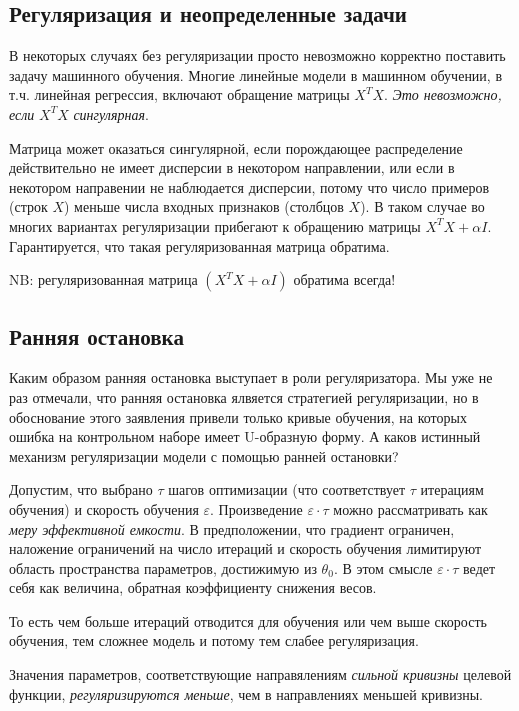 \documentclass[%
	11pt,
	a4paper,
	utf8,
]{article}
\begin{document}
\subsection{Регуляризация и неопределенные задачи}

В некоторых случаях без регуляризации просто невозможно корректно поставить задачу машинного обучения. Многие линейные модели в машинном обучении, в т.ч. линейная регрессия, включают обращение матрицы $ X^TX $. \emph{Это невозможно, если} $ X^T X $ \emph{сингулярная}.

Матрица может оказаться сингулярной, если порождающее распределение действительно не имеет дисперсии в некотором направлении, или если в некотором направении не наблюдается дисперсии, потому что число примеров (строк $ X $) меньше числа входных признаков (столбцов $ X $). В таком случае во многих вариантах регуляризации прибегают к обращению матрицы $ X^T X + \alpha I $. Гарантируется, что такая регуляризованная матрица обратима.

NB: {\color{blue}регуляризованная матрица $ (X^T X + \alpha I) $ обратима всегда!}

\subsection{Ранняя остановка}

Каким образом ранняя остановка выступает в роли регуляризатора. Мы уже не раз отмечали, что ранняя остановка ялвяется стратегией регуляризации, но в обоснование этого заявления привели только кривые обучения, на которых ошибка на контрольном наборе имеет U-образную форму. А каков истинный механизм регуляризации модели с помощью ранней остановки?

Допустим, что выбрано $ \tau $ шагов оптимизации (что соответствует $ \tau $ итерациям обучения) и скорость обучения $ \varepsilon $. Произведение $ \varepsilon \cdot \tau $ можно рассматривать как \emph{меру эффективной емкости}. В предположении, что градиент ограничен, наложение ограничений на число итераций и скорость обучения лимитируют область пространства параметров, достижимую из $ \theta_0 $. В этом смысле $ \varepsilon \cdot \tau $ ведет себя как величина, обратная коэффициенту снижения весов.

То есть чем больше итераций отводится для обучения или чем выше скорость обучения, тем сложнее модель и потому тем слабее регуляризация.

Значения параметров, соответствующие направялениям \emph{сильной кривизны} целевой функции, \emph{регуляризируются меньше}, чем в направлениях меньшей кривизны.
\end{document}
